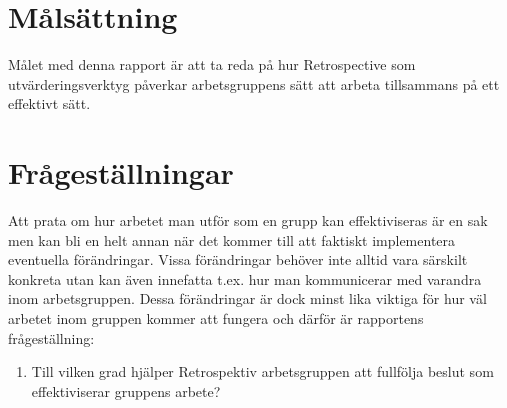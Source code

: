 
\section{Målsättning}
\label{sec:aim}

Målet med denna rapport är att ta reda på hur Retrospective som utvärderingsverktyg
påverkar arbetsgruppens sätt att arbeta tillsammans på ett effektivt sätt. 


\section{Frågeställningar}
\label{sec:research-questions}

Att prata om hur arbetet man utför som en grupp kan effektiviseras är en sak men kan bli en
helt annan när det kommer till att faktiskt implementera eventuella förändringar.
Vissa förändringar behöver inte alltid vara särskilt konkreta utan kan även innefatta t.ex. hur man 
kommunicerar med varandra inom arbetsgruppen. Dessa förändringar är dock minst lika viktiga för hur
väl arbetet inom gruppen kommer att fungera och därför är rapportens frågeställning:



\begin{enumerate}
\item Till vilken grad hjälper Retrospektiv arbetsgruppen att fullfölja beslut som effektiviserar gruppens arbete?
\end{enumerate}



